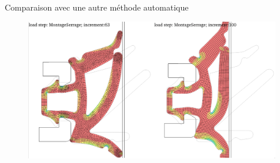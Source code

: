 \begin{frame}{Comparaison avec une autre méthode automatique}
    \begin{figure}
        \centering
        \includegraphics[width=0.99\textwidth]{img/quadsimu/comparison_with_bad_quality_mesh.PNG}
    \end{figure}
\end{frame}

